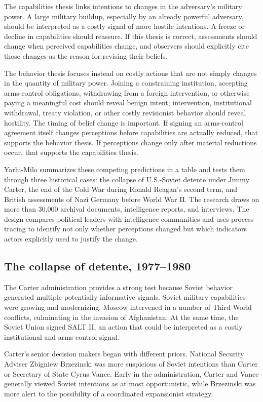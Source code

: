 The capabilities thesis links intentions to changes in the adversary's military power. A large military buildup, especially by an already powerful adversary, should be interpreted as a costly signal of more hostile intentions. A freeze or decline in capabilities should reassure. If this thesis is correct, assessments should change when perceived capabilities change, and observers should explicitly cite those changes as the reason for revising their beliefs.

The behavior thesis focuses instead on costly actions that are not simply changes in the quantity of military power. Joining a constraining institution, accepting arms-control obligations, withdrawing from a foreign intervention, or otherwise paying a meaningful cost should reveal benign intent; intervention, institutional withdrawal, treaty violation, or other costly revisionist behavior should reveal hostility. The timing of belief change is important. If signing an arms-control agreement itself changes perceptions before capabilities are actually reduced, that supports the behavior thesis. If perceptions change only after material reductions occur, that supports the capabilities thesis.

Yarhi-Milo summarizes these competing predictions in a table and tests them through three historical cases: the collapse of U.S.-Soviet detente under Jimmy Carter, the end of the Cold War during Ronald Reagan's second term, and British assessments of Nazi Germany before World War II. The research draws on more than 30,000 archival documents, intelligence reports, and interviews. The design compares political leaders with intelligence communities and uses process tracing to identify not only whether perceptions changed but which indicators actors explicitly used to justify the change.

\subsection{The collapse of detente, 1977--1980}

The Carter administration provides a strong test because Soviet behavior generated multiple potentially informative signals. Soviet military capabilities were growing and modernizing. Moscow intervened in a number of Third World conflicts, culminating in the invasion of Afghanistan. At the same time, the Soviet Union signed SALT II, an action that could be interpreted as a costly institutional and arms-control signal.

Carter's senior decision makers began with different priors. National Security Adviser Zbigniew Brzezinski was more suspicious of Soviet intentions than Carter or Secretary of State Cyrus Vance. Early in the administration, Carter and Vance generally viewed Soviet intentions as at most opportunistic, while Brzezinski was more alert to the possibility of a coordinated expansionist strategy.

